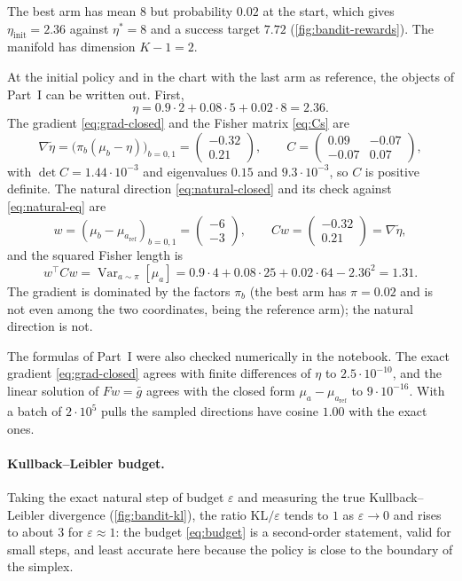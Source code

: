 \documentclass[11pt,a4paper]{article}
\numberwithin{equation}{section}
\theoremstyle{plain}
\theoremstyle{definition}
\theoremstyle{remark}
\newcommand{\T}{^{\top}}
\DeclareMathOperator{\Var}{Var}
\newcommand{\aref}{a_{\mathrm{ref}}}
\begin{document}
The best arm has mean $8$ but probability $0.02$ at the start, which gives $\eta_{\mathrm{init}}=2.36$ against $\eta^*=8$ and a success target $7.72$ (\cref{fig:bandit-rewards}). The manifold has dimension $K-1=2$.

At the initial policy and in the chart with the last arm as reference, the objects of Part~I can be written out. First,
\[
  \eta=0.9\cdot2+0.08\cdot5+0.02\cdot8=2.36 .
\]
The gradient \eqref{eq:grad-closed} and the Fisher matrix \eqref{eq:Cs} are
\[
  \nabla\tilde\eta=\bigl(\pi_b(\mu_b-\eta)\bigr)_{b=0,1}=\begin{pmatrix}-0.32\\0.21\end{pmatrix},
  \qquad
  C=\begin{pmatrix}0.09&-0.07\\-0.07&0.07\end{pmatrix},
\]
with $\det C=1.44\cdot10^{-3}$ and eigenvalues $0.15$ and $9.3\cdot10^{-3}$, so $C$ is positive definite. The natural direction \eqref{eq:natural-closed} and its check against \eqref{eq:natural-eq} are
\[
  w=(\mu_b-\mu_{\aref})_{b=0,1}=\begin{pmatrix}-6\\-3\end{pmatrix},
  \qquad
  Cw=\begin{pmatrix}-0.32\\0.21\end{pmatrix}=\nabla\tilde\eta,
\]
and the squared Fisher length is
\[
  w\T Cw=\Var_{a\sim\pi}[\mu_a]=0.9\cdot4+0.08\cdot25+0.02\cdot64-2.36^2=1.31 .
\]
The gradient is dominated by the factors $\pi_b$ (the best arm has $\pi=0.02$ and is not even among the two coordinates, being the reference arm); the natural direction is not.

The formulas of Part~I were also checked numerically in the notebook. The exact gradient \eqref{eq:grad-closed} agrees with finite differences of $\eta$ to $2.5\cdot10^{-10}$, and the linear solution of $Fw=\bar g$ agrees with the closed form $\mu_a-\mu_{\aref}$ to $9\cdot10^{-16}$.
With a batch of $2\cdot10^5$ pulls the sampled directions have cosine $1.00$ with the exact ones.

\paragraph{Kullback--Leibler budget.}
Taking the exact natural step of budget $\varepsilon$ and measuring the true Kullback--Leibler divergence (\cref{fig:bandit-kl}), the ratio $\mathrm{KL}/\varepsilon$ tends to $1$ as $\varepsilon\to0$ and rises to about $3$ for $\varepsilon\approx1$: the budget \eqref{eq:budget} is a second-order statement, valid for small steps, and
least accurate here because the policy is close to the boundary of the simplex.
\end{document}
